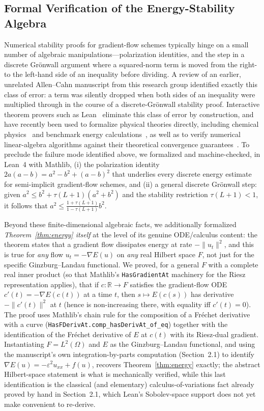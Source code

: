 \documentclass[symmetry,article,submit,moreauthors]{Definitions/mdpi}
\begin{document}
\subsection{Formal Verification of the Energy-Stability Algebra}\label{sec:lean}

Numerical stability proofs for gradient-flow schemes typically hinge on a small number of algebraic manipulations---polarization identities, and the step in a discrete Gr\"onwall argument where a squared-norm term is moved from the right- to the left-hand side of an inequality before dividing. A review of an earlier, unrelated Allen--Cahn manuscript from this research group identified exactly this class of error: a term was silently dropped when both sides of an inequality were multiplied through in the course of a discrete-Gr\"onwall stability proof. Interactive theorem provers such as Lean~\cite{DeMouraUllrich2021} eliminate this class of error by construction, and have recently been used to formalize physical theories directly, including chemical physics~\cite{Bobbin2023} and benchmark energy calculations~\cite{Ugwuanyi2025}, as well as to verify numerical linear-algebra algorithms against their theoretical convergence guarantees~\cite{Tsachouridis2020}. To preclude the failure mode identified above, we formalized and machine-checked, in Lean~4 with Mathlib, (i) the polarization identity $2a(a-b)=a^2-b^2+(a-b)^2$ that underlies every discrete energy estimate for semi-implicit gradient-flow schemes, and (ii) a general discrete Gr\"onwall step: given $a^2\le b^2+\tau(L+1)(a^2+b^2)$ and the stability restriction $\tau(L+1)<1$, it follows that $a^2\le\frac{1+\tau(L+1)}{1-\tau(L+1)}b^2$.

Beyond these finite-dimensional algebraic facts, we additionally formalized \emph{Theorem~\ref{thm:energy} itself} at the level of its genuine ODE/calculus content: the theorem states that a gradient flow dissipates energy at rate $-\|u_t\|^2$, and this is true for \emph{any} flow $u_t=-\nabla E(u)$ on \emph{any} real Hilbert space $F$, not just for the specific Ginzburg--Landau functional. We proved, for a general $F$ with a complete real inner product (so that Mathlib's \texttt{HasGradientAt} machinery for the Riesz representation applies), that if $c:\mathbb R\to F$ satisfies the gradient-flow ODE $c'(t)=-\nabla E(c(t))$ at a time $t$, then $s\mapsto E(c(s))$ has derivative $-\|c'(t)\|^2$ at $t$ (hence is non-increasing there, with equality iff $c'(t)=0$). The proof uses Mathlib's chain rule for the composition of a Fr\'echet derivative with a curve (\texttt{HasFDerivAt.comp\_hasDerivAt\_of\_eq}) together with the identification of the Fr\'echet derivative of $E$ at $c(t)$ with its Riesz-dual gradient. Instantiating $F=L^2(\Omega)$ and $E$ as the Ginzburg--Landau functional, and using the manuscript's own integration-by-parts computation (Section~2.1) to identify $\nabla E(u)=-\varepsilon^2u_{xx}+f(u)$, recovers Theorem~\ref{thm:energy} exactly; the abstract Hilbert-space statement is what is mechanically verified, while this last identification is the classical (and elementary) calculus-of-variations fact already proved by hand in Section~2.1, which Lean's Sobolev-space support does not yet make convenient to re-derive.
\end{document}
